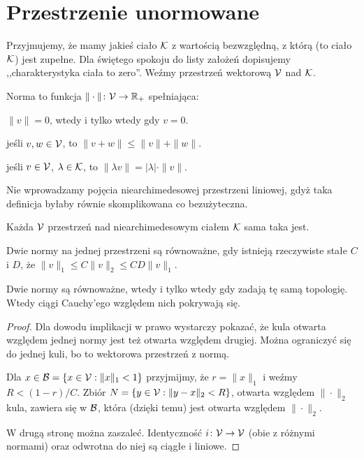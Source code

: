 \section{Przestrzenie unormowane}
Przyjmujemy, że mamy jakieś ciało $\mathcal K$ z wartością bezwzględną, z którą (to ciało $\mathcal K$) jest zupełne.
Dla świętego spokoju do listy założeń dopisujemy ,,charakterystyka ciała to zero''.
Weźmy przestrzeń wektorową $\mathcal V$ nad $\mathcal K$.

\begin{definicja}
	Norma to funkcja $\|\cdot\| \colon \mathcal V \to \mathbb R_+$ spełniająca:
	\begin{enumx}
	\item $\|v\| = 0$, wtedy i tylko wtedy gdy $v = 0$.
	\item jeśli $v, w \in \mathcal V$, to $\|v+w\| \le \|v\| + \|w\|$.
	\item jeśli $v \in \mathcal V$, $\lambda \in \mathcal K$, to $\|\lambda v\| = |\lambda| \cdot \|v\|$.
	\end{enumx}
\end{definicja}

Nie wprowadzamy pojęcia niearchimedesowej przestrzeni liniowej, gdyż taka definicja byłaby równie skomplikowana co bezużyteczna.

Każda $\mathcal V$ przestrzeń nad niearchimedesowym ciałem $\mathcal K$ sama taka jest.

\begin{definicja}
	Dwie normy na jednej przestrzeni są równoważne, gdy istnieją rzeczywiste stałe $C$ i $D$, że $\|v\|_1 \le C\|v\|_2 \le CD \|v\|_1$.
\end{definicja}

\begin{fakt}
	Dwie normy są równoważne, wtedy i tylko wtedy gdy zadają tę samą topologię.
	Wtedy ciągi Cauchy'ego względem nich pokrywają się.
\end{fakt}

\begin{proof}
	Dla dowodu implikacji w prawo wystarczy pokazać, że kula otwarta względem jednej normy jest też otwarta względem drugiej.
	Można ograniczyć się do jednej kuli, bo to wektorowa przestrzeń z normą.

	Dla $x \in \mathcal B = \{x \in \mathcal V : \|x\|_1 < 1\}$ przyjmijmy, że $r = \|x\|_1$ i weźmy $R < (1-r) / C$.
	Zbiór $N = \{y \in \mathcal V : \|y-x\|_2 < R\}$, otwarta względem $\|\cdot\|_2$ kula, zawiera się w $\mathcal B$, która (dzięki temu) jest otwarta względem $\|\cdot\|_2$.

	W drugą stronę można zaszaleć.
	Identyczność $i \colon \mathcal V \to \mathcal V$ (obie z różnymi normami) oraz odwrotna do niej są ciągłe i liniowe.
\end{proof}

